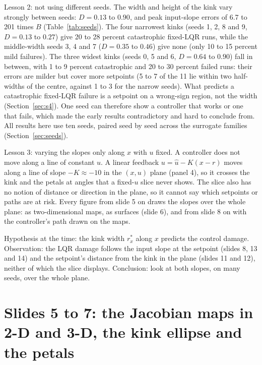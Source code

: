 \documentclass[11pt]{article}
\begin{document}
Lesson 2: not using different seeds. The width and height of the kink vary strongly between seeds: $D=0.13$ to $0.90$, and peak input-slope errors of 6.7 to 201 times $B$ (Table~\ref{tab:seeds}). The four narrowest kinks (seeds 1, 2, 8 and 9, $D=0.13$ to $0.27$) give 20 to 28 percent catastrophic fixed-LQR runs, while the middle-width seeds 3, 4 and 7 ($D=0.35$ to $0.46$) give none (only 10 to 15 percent mild failures). The three widest kinks (seeds 0, 5 and 6, $D=0.64$ to $0.90$) fall in between, with 1 to 9 percent catastrophic and 20 to 30 percent failed runs: their errors are milder but cover more setpoints (5 to 7 of the 11 lie within two half-widths of the centre, against 1 to 3 for the narrow seeds). What predicts a catastrophic fixed-LQR failure is a setpoint on a wrong-sign region, not the width (Section~\ref{sec:s4}). One seed can therefore show a controller that works or one that fails, which made the early results contradictory and hard to conclude from. All results here use ten seeds, paired seed by seed across the surrogate families (Section~\ref{sec:seeds}).

Lesson 3: varying the slopes only along $x$ with $u$ fixed. A controller does not move along a line of constant $u$. A linear feedback $u=\hat u-K(x-r)$ moves along a line of slope $-K\approx-10$ in the $(x,u)$ plane (panel 4), so it crosses the kink and the petals at angles that a fixed-$u$ slice never shows. The slice also has no notion of distance or direction in the plane, so it cannot say which setpoints or paths are at risk. Every figure from slide 5 on draws the slopes over the whole plane: as two-dimensional maps, as surfaces (slide 6), and from slide 8 on with the controller's path drawn on the maps.

Hypothesis at the time: the kink width $r^*_x$ along $x$ predicts the control damage. Observation: the LQR damage follows the input slope at the setpoint (slides 8, 13 and 14) and the setpoint's distance from the kink in the plane (slides 11 and 12), neither of which the slice displays. Conclusion: look at both slopes, on many seeds, over the whole plane.


\section{Slides 5 to 7: the Jacobian maps in 2-D and 3-D, the kink ellipse and the petals}\label{sec:s3}
\end{document}
